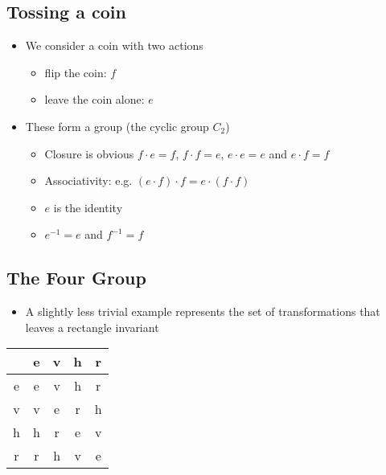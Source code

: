 \begin{slide}
\section{Tossing a coin}

\begin{PauseHighLight}
  \begin{itemize}
  \item We consider a coin with two actions
    \begin{itemize}
    \item flip the coin: $f$
    \item leave the coin alone: $e$\pause
    \end{itemize}
  \item These form a group (the cyclic group $C_2$)
    \begin{itemize}
    \item Closure is obvious $f\cdot e =f$, $f\cdot f =e$, $e\cdot e =e$
      and $e \cdot f =f$
    \item Associativity: e.g. $(e\cdot f) \cdot f = e \cdot (f \cdot f)$
    \item $e$ is the identity
    \item $e^{-1}=e$ and $f^{-1}=f$\pause
    \end{itemize}
  \end{itemize}
\end{PauseHighLight}

\end{slide}


\begin{slide}
\section[-2]{The Four Group}
    
  \pb
  
  \begin{itemize}
  \item A slightly less trivial example represents the set of
    transformations that leaves a rectangle invariant\pauseh
    \vspace*{-0.5cm}
    \begin{center}
      \pause
    \end{center}
    \vspace*{-0.5cm}
  \end{itemize}
  \begin{center} {\small
    \begin{tabular}{c|cccc}
        &e&v&h&r \\ \hline
      e&e&v&h&r \\
      v&v&e&r&h \\
      h&h&r&e&v \\
      r&r&h&v&e 
    \end{tabular}}\pauseb
  \end{center}

\end{slide}


